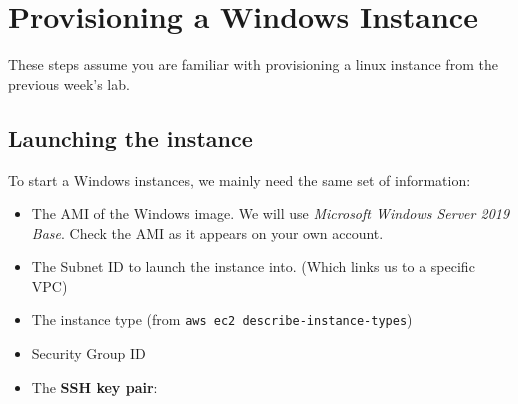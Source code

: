 \documentclass{pgnotes}
\begin{document}






\section{Provisioning a Windows
Instance}\label{provisioning-a-windows-instance}

These steps assume you are familiar with provisioning a linux instance
from the previous week's lab.

\subsection{Launching the instance}\label{launching-the-instance}

To start a Windows instances, we mainly need the same set of
information:

\begin{itemize}
\item
  The AMI of the Windows image. We will use \emph{Microsoft Windows
  Server 2019 Base}. Check the AMI as it appears on your own account.
\item
  The Subnet ID to launch the instance into. (Which links us to a specific VPC)
\item
  The instance type (from \texttt{aws\ ec2\ describe-instance-types})
\item
  Security Group ID
\item
  The \textbf{SSH key pair}:
\end{itemize}
\end{document}
